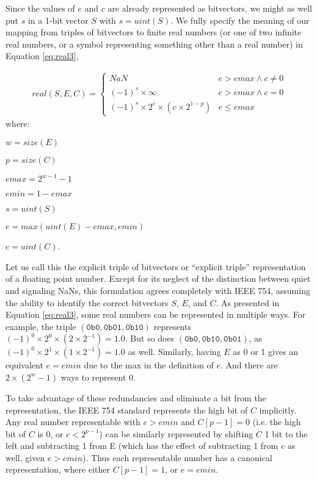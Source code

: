 \documentclass[letterpaper,10pt]{article}
\begin{document}
Since the values of $e$ and $c$ are already represented as bitvectors, we might as well put $s$ in a 1-bit vector $S$ with $s = uint(S)$. We fully specify the meaning of our mapping from triples of bitvectors to finite real numbers (or one of two infinite real numbers, or a symbol representing something other than a real number) in Equation \ref{eq:real3},

\begin{align} \label{eq:real3}
 real(S, E, C) =
 \begin{cases}
  NaN                                           & e > emax \land c \neq 0 \\
  (-1)^s \times \infty                          & e > emax \land c = 0    \\
  (-1)^s \times 2^e \times (c \times 2^{1 - p}) & e \leq emax
 \end{cases}
\end{align}
where:
\begin{description}
 \item $w = size(E)$
 \item $p = size(C)$
 \item $emax = 2^{w-1} - 1$
 \item $emin = 1 - emax$
 \item $s = uint(S)$
 \item $e = max(uint(E) - emax, emin)$
 \item $c = uint(C)$.
\end{description}

Let us call this the explicit triple of bitvectors or ``explicit triple'' representation of a floating point number. Except for its neglect of the distinction between quiet and signaling NaNs, this formulation agrees completely with IEEE 754, assuming the ability to identify the correct bitvectors $S$, $E$, and $C$. As presented in Equation \ref{eq:real3}, some real numbers can be represented in multiple ways. For example, the triple $(\texttt{0b0}, \texttt{0b01}, \texttt{0b10})$ represents $(-1)^0 \times 2^0 \times (2 \times 2^{-1}) = 1.0$. But so does $(\texttt{0b0}, \texttt{0b10}, \texttt{0b01})$, as $(-1)^0 \times 2^1 \times (1 \times 2^{-1}) = 1.0$ as well. Similarly, having $E$ as 0 or 1 gives an equivalent $e = emin$ due to the max in the definition of $e$. And there are $2 \times (2^w - 1)$ ways to represent 0.

To take advantage of these redundancies and eliminate a bit from the representation, the IEEE 754 standard represents the high bit of $C$ implicitly. Any real number representable with $e > emin$ and $C[p-1] = 0$ (i.e. the high bit of $C$ is 0, or $c < 2^{p-1}$) can be similarly represented by shifting $C$ 1 bit to the left and subtracting 1 from E (which has the effect of subtracting 1 from $e$ as well, given $e > emin$). Thus each representable number has a canonical representation, where either $C[p-1] = 1$, or $e = emin$. 
\end{document}
